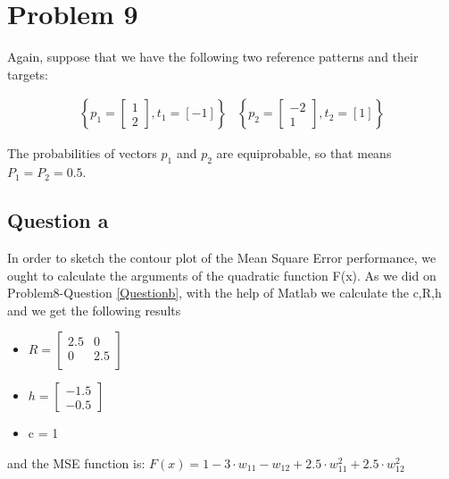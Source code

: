 

\section{Problem 9}
Again, suppose that we have the following two reference patterns and their targets:
\vspace{5mm}

\[
\begin{array}{ccc}
	\left\{ 
	p_1 = \left[
	\begin{array}{c}
		1 \\
		2
	\end{array}
	\right], t_1 = \left[-1\right]
	\right\} & 
	\left\{ 
	p_2 = \left[
	\begin{array}{c}
		-2 \\
		1
	\end{array}
	\right], t_2 = \left[1\right]
	\right\}
\end{array}
\]
\vspace{5mm}

The probabilities of vectors $p_1$ and $p_2$ are equiprobable, so that means $P_1 = P_2 = 0.5$.

\subsection{Question a}
In order to sketch the contour plot of the Mean Square Error performance, we ought to calculate the arguments of the quadratic function F(x). As we did on Problem8-Question \ref{Questionb}, with the help of Matlab we calculate the c,R,h and we get the following results\\

\begin{itemize}
	\item $R = \left[
	\begin{array}{cc}
		2.5 & 0 \\
		0 & 2.5 \\
	\end{array}
	\right]
	$
	\item $h = \left[
	\begin{array}{c}
		-1.5 \\
		-0.5
	\end{array}
	\right]
	$
	\item c = 1
\end{itemize}
and the MSE function is:
$F(x) = 1 - 3 \cdot w_{11} -w_{12} + 2.5 \cdot w_{11}^2 + 2.5 \cdot w_{12}^2$ \\

